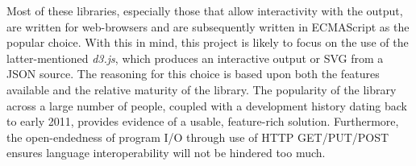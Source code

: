     
    \begin{remarks}
        Most of these libraries, especially those that allow interactivity with the output, are written for web-browsers and are subsequently written in ECMAScript as the popular choice.
        With this in mind, this project is likely to focus on the use of the latter-mentioned \textit{d3.js}, which produces an interactive output or SVG from a JSON source.
        The reasoning for this choice is based upon both the features available and the relative maturity of the library.
        The popularity of the library across a large number of people, coupled with a development history dating back to early 2011, provides evidence of a usable, feature-rich solution.
        Furthermore, the open-endedness of program I/O through use of HTTP GET/PUT/POST ensures language interoperability will not be hindered too much.
    \end{remarks}
